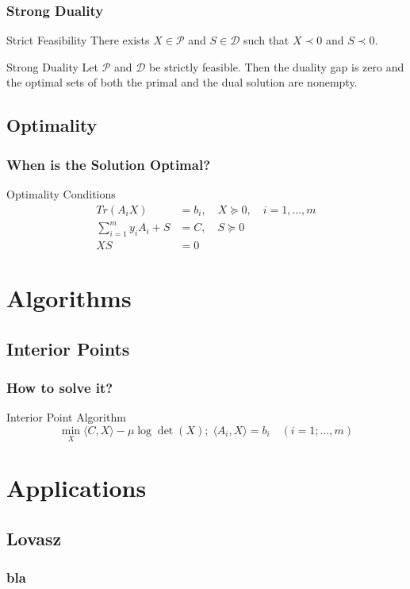 \documentclass[11pt]{beamer}
\begin{document}
\begin{frame}
	\frametitle{Strong Duality}
	\begin{block}{Strict Feasibility}
		There exists $X\in\mathcal{P}$ and $S\in\mathcal{D}$ such that $X\prec 0$ and $S\prec 0$.
	\end{block}
	\begin{block}{Strong Duality}
		Let $\mathcal{P}$ and $\mathcal{D}$ be strictly feasible. Then the duality gap is zero and the optimal sets of both the primal and the dual solution are nonempty.
	\end{block}
\end{frame}
\subsection{Optimality}
	\begin{frame}
		\frametitle{When is the Solution Optimal?}
		\begin{block}{Optimality Conditions}
			\begin{equation*}
			\begin{aligned}
			Tr(A_iX)&=b_i,\quad X\succeq 0,\quad i=1,...,m\\
			\sum_{i=1}^{m}y_iA_i+S&=C,\quad S\succeq 0\\
			XS&=0
			\end{aligned}
			\end{equation*}
		\end{block}
	\end{frame}
\section{Algorithms}
\subsection{Interior Points}
\begin{frame}
	\frametitle{How to solve it?}
	\begin{block}{Interior Point Algorithm}
		\begin{equation*}
			\min_X {\langle C,X \rangle - \mu\log\det(X);\;\langle A_i,X \rangle=b_i\quad(i=1;\dots,m)}
		\end{equation*}
	\end{block}
\end{frame}
\section{Applications}
\subsection{Lovasz}
\begin{frame}
	\frametitle{bla}
\end{frame}
\end{document}
